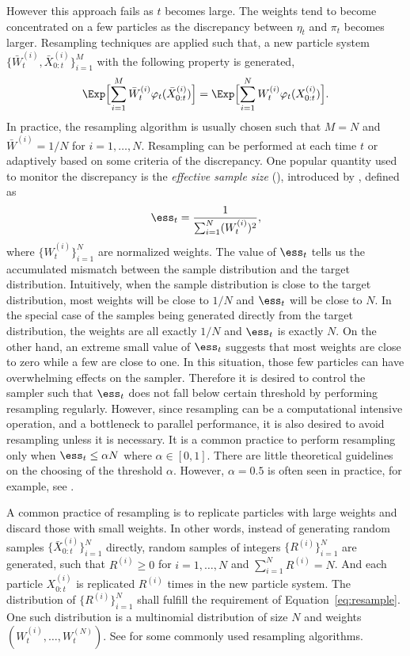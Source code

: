 \documentclass[11pt, fontset=Minion, showoverfull,
bib, biblatexstyle=numeric, mintcode, minted=cache]{marticle}
\begin{document}
However this approach fails as $t$ becomes large. The weights tend to become
concentrated on a few particles as the discrepancy between $\eta_t$ and
$\pi_t$ becomes larger. Resampling techniques are applied such that, a new
particle system $\{\bar{W}_t^{(i)},\bar{X}_{0:t}^{(i)}\}_{i=1}^M$ with the
following property is generated,
\begin{equation}
  \Exp\Bigl[\sum_{i=1}^M\bar{W}_t^{(i)}\varphi_t(\bar{X}_{0:t}^{(i)})\Bigr] =
  \Exp\Bigl[\sum_{i=1}^NW_t^{(i)}\varphi_t(X_{0:t}^{(i)})\Bigr].
  \label{eq:resample}
\end{equation}
In practice, the resampling algorithm is usually chosen such that $M = N$ and
$\bar{W}^{(i)} = 1/N$ for $i=1,\dots,N$. Resampling can be performed at each
time $t$ or adaptively based on some criteria of the discrepancy. One popular
quantity used to monitor the discrepancy is the \emph{effective sample size}
(\ess), introduced by \cite{Liu:1998iu}, defined as
\begin{equation}
  \ess_t = \frac{1}{\sum_{i=1}^N (W_t^{(i)})^2},
\end{equation}
where $\{W_t^{(i)}\}_{i=1}^N$ are normalized weights. The value of $\ess_t$
tells us the accumulated mismatch between the sample distribution and the
target distribution. Intuitively, when the sample distribution is close to the
target distribution, most weights will be close to $1/N$ and $\ess_t$ will be
close to $N$. In the special case of the samples being generated directly from
the target distribution, the weights are all exactly $1/N$ and $\ess_t$ is
exactly $N$. On the other hand, an extreme small value of $\ess_t$ suggests
that most weights are close to zero while a few are close to one. In this
situation, those few particles can have overwhelming effects on the sampler.
Therefore it is desired to control the sampler such that $\ess_t$ does not
fall below certain threshold by performing resampling regularly. However,
since resampling can be a computational intensive operation, and a bottleneck
to parallel performance, it is also desired to avoid resampling unless it is
necessary. It is a common practice to perform resampling only when $\ess_t\le
\alpha N$ where $\alpha\in[0,1]$. There are little theoretical guidelines on
the choosing of the threshold $\alpha$. However, $\alpha = 0.5$ is often seen
in practice, for example, see \cite{Jasra:2010eh}.

A common practice of resampling is to replicate particles with large weights
and discard those with small weights. In other words, instead of generating
random samples $\{\bar{X}_{0:t}^{(i)}\}_{i=1}^N$ directly, random samples of
integers $\{R^{(i)}\}_{i=1}^N$ are generated, such that $R^{(i)} \ge 0$ for $i
= 1,\dots,N$ and $\sum_{i=1}^N R^{(i)} = N$. And each particle $X_{0:t}^{(i)}$
is replicated $R^{(i)}$ times in the new particle system. The distribution of
$\{R^{(i)}\}_{i=1}^N$ shall fulfill the requirement of
Equation~\ref{eq:resample}. One such distribution is a multinomial
distribution of size $N$ and weights $(W_t^{(i)},\dots,W_t^{(N)})$. See
\cite{Douc:2005wa} for some commonly used resampling algorithms.
\end{document}
